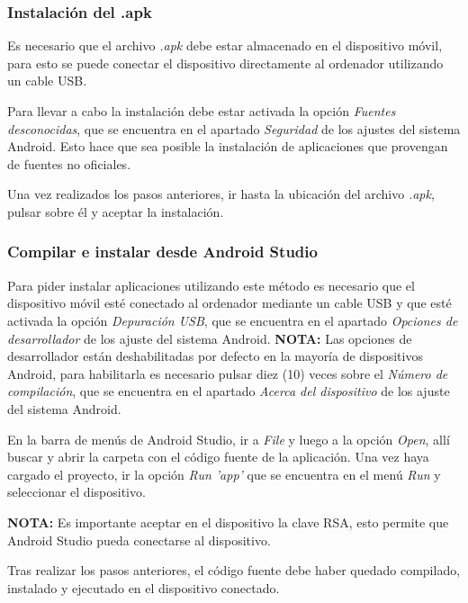 \documentclass{article}
\begin{document}
        \subsubsection{Instalación del .apk}
            Es necesario que el archivo \textit{.apk} debe estar almacenado en el dispositivo móvil, para esto se puede conectar el dispositivo directamente al ordenador utilizando un cable USB.

            Para llevar a cabo la instalación debe estar activada la opción \textit{Fuentes desconocidas}, que se encuentra en el apartado \textit{Seguridad} de los ajustes del sistema Android. Esto hace que sea posible la instalación de aplicaciones que provengan de fuentes no oficiales.

            Una vez realizados los pasos anteriores, ir hasta la ubicación del archivo \textit{.apk}, pulsar sobre él y aceptar la instalación.

        \subsubsection{Compilar e instalar desde Android Studio}
            Para pider instalar aplicaciones utilizando este método es necesario que el dispositivo móvil esté conectado al ordenador mediante un cable USB y que esté activada la opción \textit{Depuración USB}, que se encuentra en el apartado \textit{Opciones de desarrollador} de los ajuste del sistema Android.
            \textbf{NOTA:} Las opciones de desarrollador están deshabilitadas por defecto en la mayoría de dispositivos Android, para habilitarla es necesario pulsar diez (10) veces sobre el \textit{Número de compilación}, que se encuentra en el apartado \textit{Acerca del dispositivo} de los ajuste del sistema Android.

            En la barra de menús de Android Studio, ir a \textit{File} y luego a la opción \textit{Open}, allí buscar y abrir la carpeta con el código fuente de la aplicación. Una vez haya cargado el proyecto, ir la opción \textit{Run 'app'} que se encuentra en el menú \textit{Run} y seleccionar el dispositivo.
            
            \textbf{NOTA:} Es importante aceptar en el dispositivo la clave RSA, esto permite que Android Studio pueda conectarse al dispositivo.

            Tras realizar los pasos anteriores, el código fuente debe haber quedado compilado, instalado y ejecutado en el dispositivo conectado.

\end{document}
